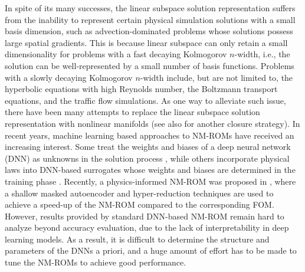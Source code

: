 In spite of its many successes, the linear subspace solution representation suffers from the inability to represent certain physical simulation solutions with a small basis dimension, such as advection-dominated problems whose solutions possess large spatial gradients. This is because linear subspace can only retain a small dimensionality for problems with a fast decaying Kolmogorov $n$-width, i.e., the solution can be well-represented by a small number of basis functions. Problems with a slowly decaying Kolmogorov $n$-width include, but are not limited to, the hyperbolic equations with high Reynolds number, the Boltzmann transport equations, and the traffic flow simulations. As one way to alleviate such issue, there have been many attempts to replace the linear subspace solution representation with nonlinear manifolds (see also \cite{BARNETT2023112420} for another closure strategy). In recent years, machine learning based approaches to NM-ROMs have received an increasing interest. Some treat the weights and biases of a deep neural network (DNN) as unknowns in the solution process \cite{dissanayake1994neural,lagaris1998artificial,meade1994numerical,van1995neural}, while others incorporate physical laws into DNN-based surrogates whose weights and biases are determined in the training phase \cite{han2018solving,lu2019deeponet,lu2021deepxde,pang2019fpinns,raissi2019physics,lee2020model,lee2019deep}. Recently, a physics-informed NM-ROM was proposed in \cite{kim2022fast}, where a shallow masked autoencoder and hyper-reduction techniques are used to achieve a speed-up of the NM-ROM compared to the corresponding FOM. However, results provided by standard DNN-based NM-ROM remain hard to analyze beyond accuracy evaluation, due to the lack of interpretability in deep learning models. As a result, it is difficult to determine the structure and parameters of the DNNs a priori, and a huge amount of effort has to be made to tune the NM-ROMs to achieve good performance. 

